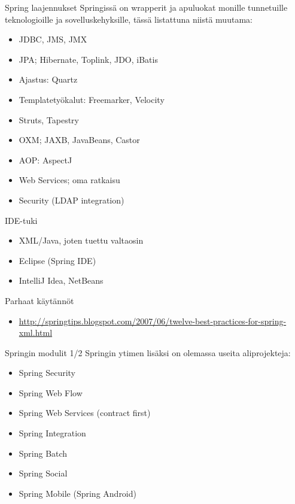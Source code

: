 \documentclass[hyperref={pdfauthor=\AUTHOR},14pt]{beamer}
\begin{document}
\begin{frame}{Spring laajennukset}
Springissä on wrapperit ja apuluokat monille tunnetuille
teknologioille ja sovelluskehyksille, tässä listattuna niistä muutama:
\begin{itemize}
\item JDBC, JMS, JMX
\item JPA; Hibernate, Toplink, JDO, iBatis
\item Ajastus: Quartz
\item Templatetyökalut: Freemarker, Velocity
\item Struts, Tapestry
\item OXM; JAXB, JavaBeans, Castor 
\item AOP: AspectJ
\item Web Services; oma ratkaisu
\item Security (LDAP integration)
\end{itemize}
\end{frame}

\begin{frame}{IDE-tuki}
\begin{itemize}
\item XML/Java, joten tuettu valtaosin
\item Eclipse (Spring IDE)
\item IntelliJ Idea, NetBeans
\end{itemize}
\end{frame}

\begin{frame}{Parhaat käytännöt}
\begin{itemize}
\item \url{http://springtips.blogspot.com/2007/06/twelve-best-practices-for-spring-xml.html}
\end{itemize}
\end{frame}



\begin{frame}{Springin modulit 1/2}
Springin ytimen lisäksi on olemassa useita aliprojekteja:
\begin{itemize}
\item Spring Security
\item Spring Web Flow
\item Spring Web Services (contract first)
\item Spring Integration 
\item Spring Batch
\item Spring Social
\item Spring Mobile (Spring Android)
\end{itemize}
\end{frame}
\end{document}
